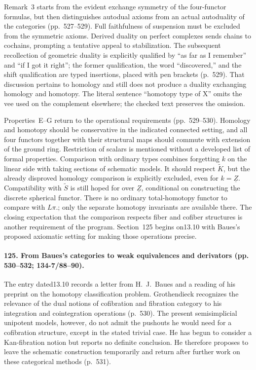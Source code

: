 Remark~3 starts from the evident exchange symmetry of the four-functor formulas, but then distinguishes autodual axioms from an actual autoduality of the categories (pp.~527--529). Full faithfulness of suspension must be excluded from the symmetric axioms. Derived duality on perfect complexes sends chains to cochains, prompting a tentative appeal to stabilization. The subsequent recollection of geometric duality is explicitly qualified by ``as far as I remember'' and ``if I got it right''; the former qualification, the word ``discovered,'' and the shift qualification are typed insertions, placed with pen brackets (p.~529). That discussion pertains to homology and still does not produce a duality exchanging homology and homotopy. The literal sentence ``homotopy type of X'' omits the vee used on the complement elsewhere; the checked text preserves the omission.

Properties~E--G return to the operational requirements (pp.~529--530). Homology and homotopy should be conservative in the indicated connected setting, and all four functors together with their structural maps should commute with extension of the ground ring. Restriction of scalars is mentioned without a developed list of formal properties. Comparison with ordinary types combines forgetting $k$ on the linear side with taking sections of schematic models. It should respect $\widetilde K$, but the already disproved homology comparison is explicitly excluded, even for $k=\underline Z$. Compatibility with $\widetilde S$ is still hoped for over $\underline Z$, conditional on constructing the discrete spherical functor. There is no ordinary total-homotopy functor to compare with $L\pi.$; only the separate homotopy invariants are available there. The closing expectation that the comparison respects fiber and cofiber structures is another requirement of the program. Section~125 begins on13.10 with Baues's proposed axiomatic setting for making those operations precise.

\paragraph{125. From Baues's categories to weak equivalences and derivators (pp. 530--532; 134-7/88--90).}
The entry dated13.10 records a letter from H.~J.~Baues and a reading of his preprint on the homotopy classification problem. Grothendieck recognizes the relevance of the dual notions of cofibration and fibration category to his integration and cointegration operations (p.~530). The present semisimplicial unipotent models, however, do not admit the pushouts he would need for a cofibration structure, except in the stated trivial case. He has begun to consider a Kan-fibration notion but reports no definite conclusion. He therefore proposes to leave the schematic construction temporarily and return after further work on these categorical methods (p.~531).

